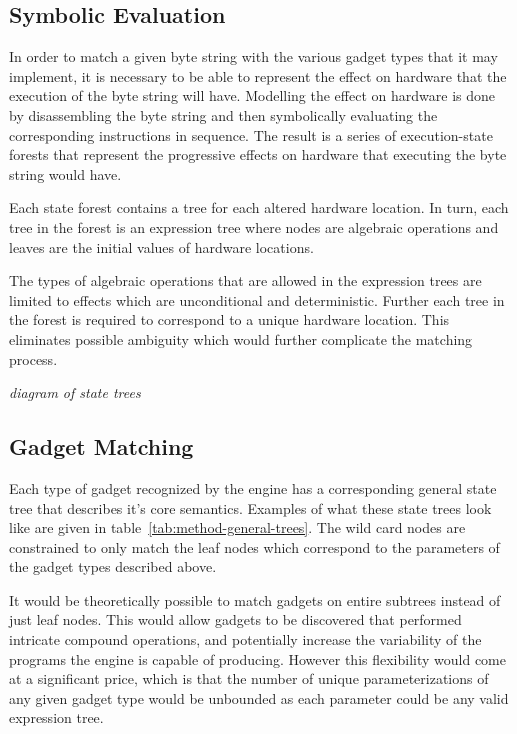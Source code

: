     \subsection{Symbolic Evaluation}

    In order to match a given byte string with the various gadget types that it
    may implement, it is necessary to be able to represent the effect on
    hardware that the execution of the byte string will have. Modelling the
    effect on hardware is done by disassembling the byte string and then
    symbolically evaluating the corresponding instructions in sequence. The
    result is a series of execution-state forests that represent the progressive
    effects on hardware that executing the byte string would have.

    Each state forest contains a tree for each altered hardware location.  In
    turn, each tree in the forest is an expression tree where nodes are
    algebraic operations and leaves are the initial values of hardware
    locations.

    The types of algebraic operations that are allowed in the expression trees
    are limited to effects which are unconditional and deterministic. Further
    each tree in the forest is required to correspond to a unique hardware
    location. This eliminates possible ambiguity which would further complicate
    the matching process.

    \emph{diagram of state trees}
    
    \subsection{Gadget Matching}

    Each type of gadget recognized by the engine has a corresponding general
    state tree that describes it's core semantics. Examples of what these state
    trees look like are given in table~\ref{tab:method-general-trees}. The wild
    card nodes are constrained to only match the leaf nodes which correspond to
    the parameters of the gadget types described above.

    It would be theoretically possible to match gadgets on entire subtrees
    instead of just leaf nodes. This would allow gadgets to be discovered that
    performed intricate compound operations, and potentially increase the
    variability of the programs the engine is capable of producing. However this
    flexibility would come at a significant price, which is that the number of
    unique parameterizations of any given gadget type would be unbounded as each
    parameter could be any valid expression tree.

